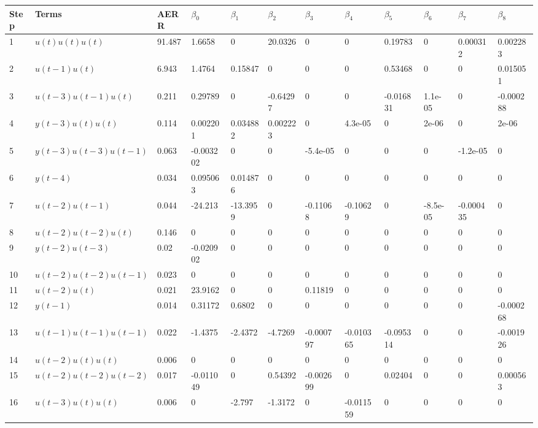\begin{tabular}{llllllllllll}
Step & Terms & AERR & $\beta_{0}$ & $\beta_{1}$ & $\beta_{2}$ & $\beta_{3}$ & $\beta_{4}$ & $\beta_{5}$ & $\beta_{6}$ & $\beta_{7}$ & $\beta_{8}$ \\ 
\hline 
1 & $u(t)u(t)u(t)$ & 91.487 & 1.6658 & 0 & 20.0326 & 0 & 0 & 0.19783 & 0 & 0.000312 & 0.002283 \\ 
2 & $u(t-1)u(t)$ & 6.943 & 1.4764 & 0.15847 & 0 & 0 & 0 & 0.53468 & 0 & 0 & 0.015051 \\ 
3 & $u(t-3)u(t-1)u(t)$ & 0.211 & 0.29789 & 0 & -0.64297 & 0 & 0 & -0.016831 & 1.1e-05 & 0 & -0.000288 \\ 
4 & $y(t-3)u(t)u(t)$ & 0.114 & 0.002201 & 0.034882 & 0.002223 & 0 & 4.3e-05 & 0 & 2e-06 & 0 & 2e-06 \\ 
5 & $y(t-3)u(t-3)u(t-1)$ & 0.063 & -0.003202 & 0 & 0 & -5.4e-05 & 0 & 0 & 0 & -1.2e-05 & 0 \\ 
6 & $y(t-4)$ & 0.034 & 0.095063 & 0.014876 & 0 & 0 & 0 & 0 & 0 & 0 & 0 \\ 
7 & $u(t-2)u(t-1)$ & 0.044 & -24.213 & -13.3959 & 0 & -0.11068 & -0.10629 & 0 & -8.5e-05 & -0.000435 & 0 \\ 
8 & $u(t-2)u(t-2)u(t)$ & 0.146 & 0 & 0 & 0 & 0 & 0 & 0 & 0 & 0 & 0 \\ 
9 & $y(t-2)u(t-3)$ & 0.02 & -0.020902 & 0 & 0 & 0 & 0 & 0 & 0 & 0 & 0 \\ 
10 & $u(t-2)u(t-2)u(t-1)$ & 0.023 & 0 & 0 & 0 & 0 & 0 & 0 & 0 & 0 & 0 \\ 
11 & $u(t-2)u(t)$ & 0.021 & 23.9162 & 0 & 0 & 0.11819 & 0 & 0 & 0 & 0 & 0 \\ 
12 & $y(t-1)$ & 0.014 & 0.31172 & 0.6802 & 0 & 0 & 0 & 0 & 0 & 0 & -0.000268 \\ 
13 & $u(t-1)u(t-1)u(t-1)$ & 0.022 & -1.4375 & -2.4372 & -4.7269 & -0.000797 & -0.010365 & -0.095314 & 0 & 0 & -0.001926 \\ 
14 & $u(t-2)u(t)u(t)$ & 0.006 & 0 & 0 & 0 & 0 & 0 & 0 & 0 & 0 & 0 \\ 
15 & $u(t-2)u(t-2)u(t-2)$ & 0.017 & -0.011049 & 0 & 0.54392 & -0.002699 & 0 & 0.02404 & 0 & 0 & 0.000563 \\ 
16 & $u(t-3)u(t)u(t)$ & 0.006 & 0 & -2.797 & -1.3172 & 0 & -0.011559 & 0 & 0 & 0 & 0 \\ 
\hline 
\end{tabular}